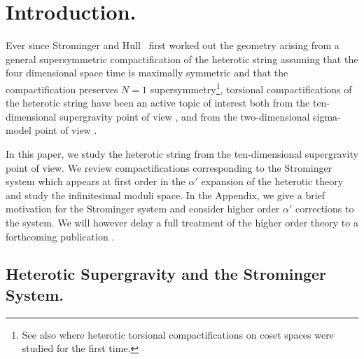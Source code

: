 \documentclass[12pt,a4paper]{article}
\def\a{\alpha'}
\theoremstyle{definition}
\begin{document}

\maketitle

\newpage



\section{Introduction.}
\label{sed:intro}
Ever since Strominger and Hull~\citep{Strominger:1986uh, Hull:1986kz} first worked out the geometry arising from a general  supersymmetric compactification of the heterotic string assuming that the four dimensional space time is maximally symmetric and that the compactification preserves $N=1$ supersymmetry\footnote{See also \citep{Lust:1986ix} where heterotic torsional compactifications on coset spaces were studied for the first time.}, torsional compactifications of the heterotic string have been an active topic of interest
both from the ten-dimensional supergravity point of view \citep{Lust:1986ix, Bergshoeff1989439, Bergshoeff:1988nn, Dasgupta:1999ss, 
1999math......1090A, Ivanov:2000fg, 2001CQGra..18.1089I, 2001math......2142F, Becker:2002sx, Gauntlett:2003cy, Becker:2003yv, Becker:2003sh, LopesCardoso:2003sp, LopesCardoso:2003af, Becker:2005nb, Becker:2006xp, Lapan2006, Becker:2006et, Fu:2006vj, Becker:2009df,  Andreas:2010cv, 2012CMaPh.315..153A, 2013arXiv1304.4294G}, 
and from the two-dimensional sigma-model point of view \citep{Adams:2006kb, Sharpe:2008rd, Kreuzer:2010ph, McOrist:2010ae, Beccaria:2010yp, NibbelinkGroot:2010wm, McOrist:2011bn,  Melnikov:2011ez, Blaszczyk:2011ib, Quigley:2011pv, Adams:2012sh, Nibbelink:2012wb, Melnikov:2012hk, Quigley:2012gq, Melnikov:2012nm}.  

In this paper, we study the heterotic string from the ten-dimensional supergravity point of view. We review compactifications corresponding to the Strominger system which appears at first order in the $\a$ expansion of the heterotic theory and study the infinitesimal moduli space.  In the Appendix, we give a brief motivation for the Strominger system and consider higher order $\a$ corrections to the system. We will however delay a full treatment of the higher order theory to a forthcoming  publication \citep{delaossa2014}.

\subsection{Heterotic Supergravity and the Strominger System.}
\end{document}
